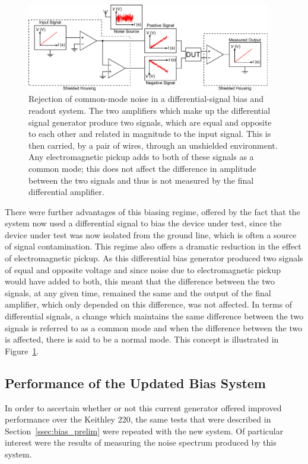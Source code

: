 \begin{figure}[t]
\begin{center}
\includegraphics[width = 0.95\textwidth]{figures/differential_noise}
\caption[Rejection of common-mode noise in a differential bias and readout system]{Rejection of common-mode noise in a differential-signal bias and readout system. The two amplifiers which make up the differential signal generator produce two signals, which are equal and opposite to each other and related in magnitude to the input signal. This is then carried, by a pair of wires, through an unshielded environment. Any electromagnetic pickup adds to both of these signals as a common mode; this does not affect the difference in amplitude between the two signals and thus is not measured by the final differential amplifier.}
\label{fig:differential_noise_rejection}
\end{center}
\end{figure}
There were further advantages of this biasing regime, offered by the fact that the system now used a differential signal to bias the device under test, since the device under test was now isolated from the ground line, which is often a source of signal contamination. This regime also offers a dramatic reduction in the effect of electromagnetic pickup. As this differential bias generator produced two signals of equal and opposite voltage and since noise due to electromagnetic pickup would have added to both, this meant that the difference between the two signals, at any given time, remained the same and the output of the final amplifier, which only depended on this difference, was not affected. In terms of differential signals, a change which maintains the same difference between the two signals is referred to as a common mode and when the difference between the two is affected, there is said to be a normal mode. This concept is illustrated in Figure~\ref{fig:differential_noise_rejection}.

\subsection{Performance of the Updated Bias System}
\label{ssec:RTD_bias_performance} 
In order to ascertain whether or not this current generator offered improved performance over the Keithley 220, the same tests that were described in Section~\ref{ssec:bias_prelim} were repeated with the new system. Of particular interest were the results of measuring the noise spectrum produced by this system.

